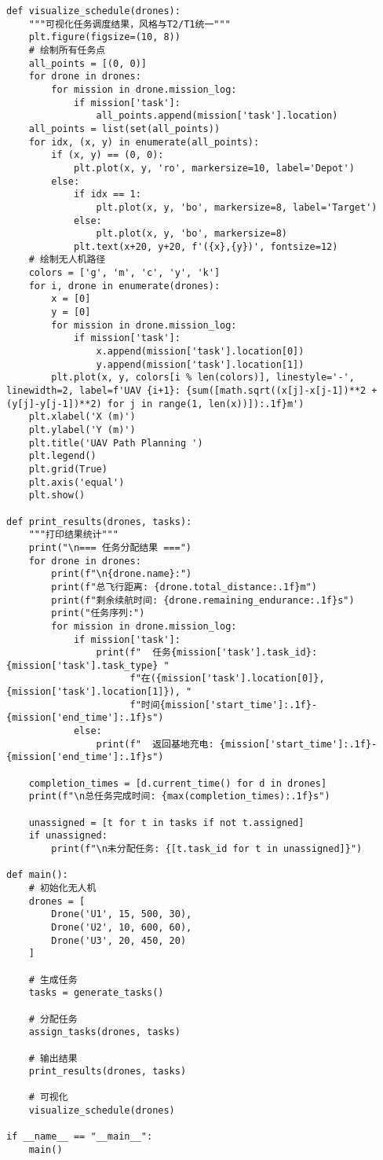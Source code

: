 \documentclass[12pt,fontset=adobe]{ctexart}
\begin{document}
\begin{verbatim}
def visualize_schedule(drones):
    """可视化任务调度结果，风格与T2/T1统一"""
    plt.figure(figsize=(10, 8))
    # 绘制所有任务点
    all_points = [(0, 0)]
    for drone in drones:
        for mission in drone.mission_log:
            if mission['task']:
                all_points.append(mission['task'].location)
    all_points = list(set(all_points))
    for idx, (x, y) in enumerate(all_points):
        if (x, y) == (0, 0):
            plt.plot(x, y, 'ro', markersize=10, label='Depot')
        else:
            if idx == 1:
                plt.plot(x, y, 'bo', markersize=8, label='Target')
            else:
                plt.plot(x, y, 'bo', markersize=8)
            plt.text(x+20, y+20, f'({x},{y})', fontsize=12)
    # 绘制无人机路径
    colors = ['g', 'm', 'c', 'y', 'k']
    for i, drone in enumerate(drones):
        x = [0]
        y = [0]
        for mission in drone.mission_log:
            if mission['task']:
                x.append(mission['task'].location[0])
                y.append(mission['task'].location[1])
        plt.plot(x, y, colors[i % len(colors)], linestyle='-', linewidth=2, label=f'UAV {i+1}: {sum([math.sqrt((x[j]-x[j-1])**2 + (y[j]-y[j-1])**2) for j in range(1, len(x))]):.1f}m')
    plt.xlabel('X (m)')
    plt.ylabel('Y (m)')
    plt.title('UAV Path Planning ')
    plt.legend()
    plt.grid(True)
    plt.axis('equal')
    plt.show()

def print_results(drones, tasks):
    """打印结果统计"""
    print("\n=== 任务分配结果 ===")
    for drone in drones:
        print(f"\n{drone.name}:")
        print(f"总飞行距离: {drone.total_distance:.1f}m")
        print(f"剩余续航时间: {drone.remaining_endurance:.1f}s")
        print("任务序列:")
        for mission in drone.mission_log:
            if mission['task']:
                print(f"  任务{mission['task'].task_id}: {mission['task'].task_type} "
                      f"在({mission['task'].location[0]},{mission['task'].location[1]}), "
                      f"时间{mission['start_time']:.1f}-{mission['end_time']:.1f}s")
            else:
                print(f"  返回基地充电: {mission['start_time']:.1f}-{mission['end_time']:.1f}s")
    
    completion_times = [d.current_time() for d in drones]
    print(f"\n总任务完成时间: {max(completion_times):.1f}s")
    
    unassigned = [t for t in tasks if not t.assigned]
    if unassigned:
        print(f"\n未分配任务: {[t.task_id for t in unassigned]}")

def main():
    # 初始化无人机
    drones = [
        Drone('U1', 15, 500, 30),
        Drone('U2', 10, 600, 60),
        Drone('U3', 20, 450, 20)
    ]
    
    # 生成任务
    tasks = generate_tasks()
    
    # 分配任务
    assign_tasks(drones, tasks)
    
    # 输出结果
    print_results(drones, tasks)
    
    # 可视化
    visualize_schedule(drones)

if __name__ == "__main__":
    main()
\end{verbatim}
\end{document}
